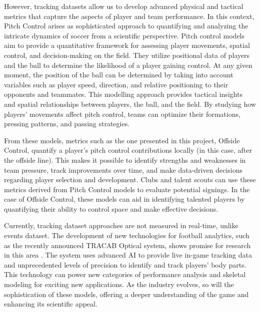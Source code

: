 \documentclass[twoside,nohyper]{tufte-book}
\begin{document}
However, tracking datasets allow us to develop advanced physical and
tactical metrics that capture the aspects of player and team
performance. In this context, Pitch Control arises as sophisticated
approach to quantifying and analyzing the intricate dynamics of soccer
from a scientific perspective. Pitch control models aim to provide a
quantitative framework for assessing player movements, spatial control,
and decision-making on the field. They utilize positional data of
players and the ball to determine the likelihood of a player gaining
control. At any given moment, the position of the ball can be determined
by taking into account variables such as player speed, direction, and
relative positioning to their opponents and teammates. This modelling
approach provides tactical insights and spatial relationships between
players, the ball, and the field. By studying how players' movements
affect pitch control, teams can optimize their formations, pressing
patterns, and passing strategies.

From these models, metrics such as the one presented in this project,
Offside Control, quantify a player's pitch control contributions locally
(in this case, after the offside line). This makes it possible to
identify strengths and weaknesses in team pressure, track improvements
over time, and make data-driven decisions regarding player selection and
development. Clubs and talent scouts can use these metrics derived from
Pitch Control models to evaluate potential signings. In the case of
Offside Control, these models can aid in identifying talented players by
quantifying their ability to control space and make effective decisions.

Currently, tracking dataset approaches are not measured in real-time,
unlike events dataset. The development of new technologies for football
analytics, such as the recently announced TRACAB Optical system, shows
promise for research in this area \citep{TRACAB}. The system uses advanced AI
to provide live in-game tracking data and unprecedented levels of
precision to identify and track players' body parts. This technology can
power new categories of performance analysis and skeletal modeling for
exciting new applications. As the industry evolves, so will the
sophistication of these models, offering a deeper understanding of the
game and enhancing its scientific appeal.


\end{document}
